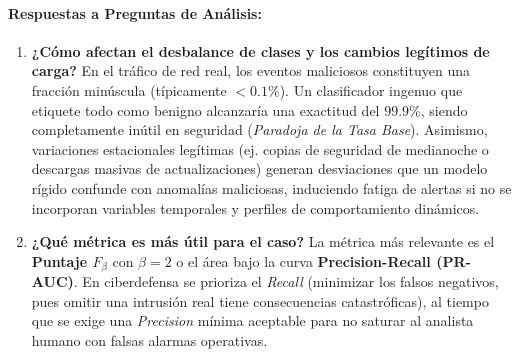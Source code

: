 \documentclass[11pt,letterpaper]{article}
\begin{document}
\paragraph{Respuestas a Preguntas de Análisis:}
\begin{enumerate}
    \item \textbf{¿Cómo afectan el desbalance de clases y los cambios legítimos de carga?} En el tráfico de red real, los eventos maliciosos constituyen una fracción minúscula (típicamente $<0.1\%$). Un clasificador ingenuo que etiquete todo como benigno alcanzaría una exactitud del $99.9\%$, siendo completamente inútil en seguridad (\textit{Paradoja de la Tasa Base}). Asimismo, variaciones estacionales legítimas (ej. copias de seguridad de medianoche o descargas masivas de actualizaciones) generan desviaciones que un modelo rígido confunde con anomalías maliciosas, induciendo fatiga de alertas si no se incorporan variables temporales y perfiles de comportamiento dinámicos.
    \item \textbf{¿Qué métrica es más útil para el caso?} La métrica más relevante es el \textbf{Puntaje $F_{\beta}$} con $\beta=2$ o el área bajo la curva \textbf{Precision-Recall (PR-AUC)}. En ciberdefensa se prioriza el \textit{Recall} (minimizar los falsos negativos, pues omitir una intrusión real tiene consecuencias catastróficas), al tiempo que se exige una \textit{Precision} mínima aceptable para no saturar al analista humano con falsas alarmas operativas.
\end{enumerate}
\end{document}

